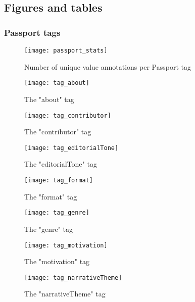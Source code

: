 
\subsection{Figures and tables}

\subsubsection{Passport tags}

\begin{figure}[H]
  \centering
  \texttt{[image: passport\_stats]}
  \caption{Number of unique value annotations per Passport tag}
  \label{fig:passport_stats}
\end{figure}

\begin{figure}[H]
  \centering
  \texttt{[image: tag\_about]}
  \caption{The "about" tag}
  \label{fig:tag_about}
\end{figure}

\begin{figure}[H]
  \centering
  \texttt{[image: tag\_contributor]}
  \caption{The "contributor" tag}
  \label{fig:tag_contributor}
\end{figure}

\begin{figure}[H]
  \centering
  \texttt{[image: tag\_editorialTone]}
  \caption{The "editorialTone" tag}
  \label{fig:tag_editorialTone}
\end{figure}

\begin{figure}[H]
  \centering
  \texttt{[image: tag\_format]}
  \caption{The "format" tag}
  \label{fig:tag_format}
\end{figure}

\begin{figure}[H]
  \centering
  \texttt{[image: tag\_genre]}
  \caption{The "genre" tag}
  \label{fig:tag_genre}
\end{figure}

\begin{figure}[H]
  \centering
  \texttt{[image: tag\_motivation]}
  \caption{The "motivation" tag}
  \label{fig:tag_motivation}
\end{figure}

\begin{figure}[H]
  \centering
  \texttt{[image: tag\_narrativeTheme]}
  \caption{The "narrativeTheme" tag}
  \label{fig:tag_narrativeTheme}
\end{figure}

